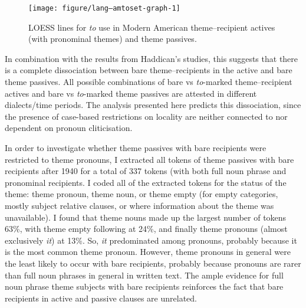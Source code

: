 {\begin{knitrout}
\color{fgcolor}\begin{figure}[ht!]

{\centering \texttt{[image: figure/lang--amtoset-graph-1]} 

}

\caption{LOESS lines for \textit{to} use in Modern American theme--recipient actives (with pronominal themes) and theme passives.\label{fig:amdata}}\label{fig:amtoset-graph}
\end{figure}


\end{knitrout}


In combination with the results from Haddican's studies, this suggests that there is a complete dissociation between bare theme--recipients in the active and bare theme passives. All possible combinations of bare vs \textit{to}-marked theme--recipient actives and bare vs \textit{to}-marked theme passives are attested in different dialects/time periods. The analysis presented here predicts this dissociation, since the presence of case-based restrictions on locality are neither connected to nor dependent on pronoun cliticisation.




In order to investigate whether theme passives with bare recipients were restricted to theme pronouns, I extracted all tokens of theme passives with bare recipients after 1940 for a total of 337 tokens (with both full noun phrase and pronominal recipients. I coded all of the extracted tokens for the status of the theme: theme pronoun, theme noun, or theme empty (for empty categories, mostly subject relative clauses, or where information about the theme was unavailable). I found that theme nouns made up the largest number of tokens 63\%, with theme empty following at 24\%, and finally theme pronouns (almost exclusively \textit{it}) at 13\%. So, \textit{it} predominated among pronouns, probably because it is the most common theme pronoun. However, theme pronouns in general were the least likely to occur with bare recipients, probably because pronouns are rarer than full noun phrases in general in written text. The ample evidence for full noun phrase theme subjects with bare recipients reinforces the fact that bare recipients in active and passive clauses are unrelated.

}
